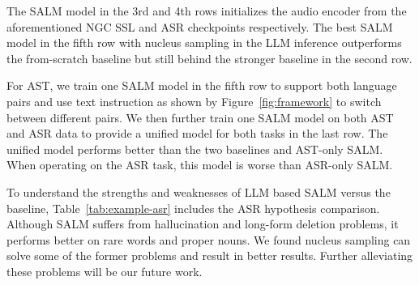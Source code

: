 \documentclass{article}
\begin{document}




The SALM model in the 3rd and 4th rows initializes the audio encoder from the aforementioned NGC SSL and ASR  checkpoints respectively.
The best SALM model in the fifth row with nucleus sampling in the LLM inference outperforms the from-scratch baseline but still behind the stronger baseline in the second row. 

For AST, we train  one SALM model in the fifth row to support both language pairs and use text instruction as shown by Figure~\ref{fig:framework} to switch between different pairs. 
%
We then further train one SALM model on both AST and ASR data to provide a unified model for both tasks in the last row. The unified model performs better than the two baselines and AST-only SALM. When operating on the ASR task, this model is  worse than ASR-only SALM. 


To understand the strengths and weaknesses of LLM based SALM versus the baseline,  
Table~\ref{tab:example-asr} includes the
ASR hypothesis comparison. Although SALM suffers from hallucination and long-form deletion problems, it performs better on rare words and proper nouns. 
%
We found nucleus sampling can solve some of the former problems and result in better results. Further alleviating these problems will be our future work. 
%
\end{document}
